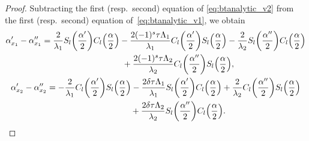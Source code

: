\documentclass[pdftex]{sigma}
\numberwithin{equation}{section}
\begin{document}
\begin{proof}
Subtracting the first (resp.\ second) equation of \eqref{eq:btanalytic_v2} from the first
(resp.\ second) equation of~\eqref{eq:btanalytic_v1}, we obtain
\begin{gather}
\alpha'_{x_1}-\alpha''_{x_1}= \frac{2}{\lambda_1}S_{l}\biggl(\frac{\alpha'}{2}\biggr)C_{l}\Bigl(\frac{\alpha}{2}\Bigr)-\frac{2(-1)^s\tau\Lambda_1}{\lambda_1} C_{l}\biggl(\frac{\alpha'}{2}\biggr)S_{l}\Bigl(\frac{\alpha}{2}\Bigr) -\frac{2}{\lambda_2}S_{l}\biggl(\frac{\alpha''}{2}\biggr)C_{l}\Bigl(\frac{\alpha}{2}\Bigr)
\nonumber\\ \hphantom{\alpha'_{x_1}-\alpha''_{x_1}=}{}
+\frac{2(-1)^s\tau\Lambda_2}{\lambda_2}C_{l}
\biggl(\frac{\alpha''}{2}\biggr)S_{l}\Bigl(\frac{\alpha}{2}\Bigr),\label{eq:primv1-v2}
\\
\alpha'_{x_2}-\alpha''_{x_2}=
-\frac{2}{\lambda_1}C_{l}\biggl(\frac{\alpha'}{2}\biggr)S_{l}\Bigl(\frac{\alpha}{2}\Bigr)-\frac{2\delta\tau\Lambda_1}{\lambda_1} S_{l}\biggl(\frac{\alpha'}{2}\biggr)C_{l}\Bigl(\frac{\alpha}{2}\Bigr) +\frac{2}{\lambda_2}C_{l}\biggl(\frac{\alpha''}
{2 }\biggr)S_{l}\Bigl(\frac{\alpha}{2}\Bigr)
\nonumber\\ \hphantom{\alpha'_{x_2}-\alpha''_{x_2}=}{}
+\frac{2\delta\tau\Lambda_2}{\lambda_2} S_{l}\biggl(\frac{\alpha''}{2}\biggr)C_{l}\Bigl(\frac{\alpha}{2}\Bigr).\label{eq:segv1-v2}
\end{gather}


\end{proof}
\end{document}
